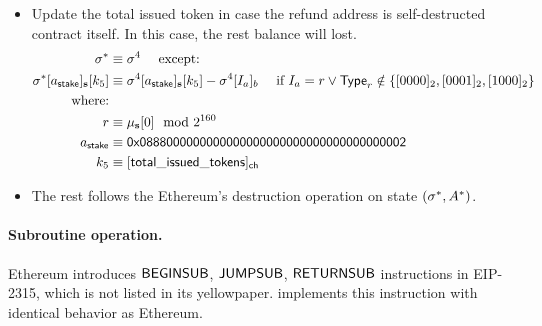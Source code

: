 \begin{itemize}[nosep]
	\item Update the total issued token in case the refund address is self-destructed contract itself. In this case, the rest balance will lost. 
	\begin{align}
		\st^{*} & \eqdef \st^4 \quad\mbox{ except:} \\ 
		\st^{*}[a_{\sf stake}]_{\bf s}[k_5] & \eqdef \st^4[a_{\sf stake}]_{\bf s}[k_5] - \st^4[I_a]_b\quad \mbox{ if $I_a= r \vee \mathsf{Type}_r\notin\set{\typereserved,\typenormal,\typecontract}$} \\ 
		\mbox{where:}& \\ 
		r &\eqdef \mst_{\mathbf{s}}[0] \mod 2^{160} \\
		a_{\sf stake} &\eqdef \stakingcontract \\ 
		k_5 &\eqdef {\sf [total\char`_issued\char`_tokens]_{\sf ch}}\label{eq:suicide_end}
	\end{align}

	\item The rest follows the Ethereum's destruction operation on state $(\mathbf{\sigma}^*,A^*)$.
\end{itemize}


\paragraph{Subroutine operation.} Ethereum introduces $\mathsf{BEGINSUB}$, $\mathsf{JUMPSUB}$, $\mathsf{RETURNSUB}$ instructions in EIP-2315, which is not listed in its yellowpaper. 
{\name} implements this instruction with identical behavior as Ethereum.



